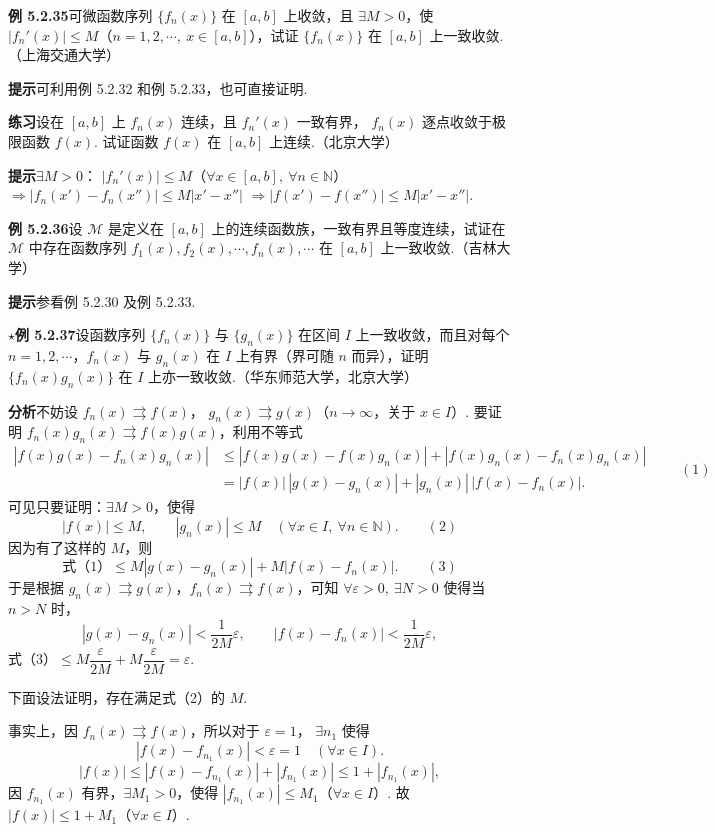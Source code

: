 \documentclass[UTF8,12pt,a4paper,fontset=fandol]{ctexart}
\begin{document}
\noindent\textbf{例 5.2.35}\quad 可微函数序列 $\{f_n(x)\}$ 在 $[a,b]$ 上收敛，且
$\exists M>0$，使 $|f_n'(x)|\le M$（$n=1,2,\cdots,\ x\in[a,b]$），试证
$\{f_n(x)\}$ 在 $[a,b]$ 上一致收敛.（上海交通大学）

\noindent\textbf{提示}\quad 可利用例 5.2.32 和例 5.2.33，也可直接证明.

\noindent\textbf{练习}\quad 设在 $[a,b]$ 上 $f_n(x)$ 连续，且 $f_n'(x)$ 一致有界，
$f_n(x)$ 逐点收敛于极限函数 $f(x)$. 试证函数 $f(x)$ 在 $[a,b]$ 上连续.（北京大学）

\noindent\textbf{提示}\quad $\exists M>0$：
$|f_n'(x)|\le M$（$\forall x\in[a,b],\ \forall n\in\mathbb N$）
$\Rightarrow |f_n(x')-f_n(x'')|\le M|x'-x''|$
$\Rightarrow |f(x')-f(x'')|\le M|x'-x''|$.

\noindent\textbf{例 5.2.36}\quad 设 $\mathcal M$ 是定义在 $[a,b]$ 上的连续函数族，一致有界且等度连续，试证在
$\mathcal M$ 中存在函数序列 $f_1(x),f_2(x),\cdots,f_n(x),\cdots$ 在
$[a,b]$ 上一致收敛.（吉林大学）

\noindent\textbf{提示}\quad 参看例 5.2.30 及例 5.2.33.

\noindent\textbf{$\star$例 5.2.37}\quad 设函数序列 $\{f_n(x)\}$ 与 $\{g_n(x)\}$ 在区间 $I$ 上一致收敛，而且对每个
$n=1,2,\cdots$，$f_n(x)$ 与 $g_n(x)$ 在 $I$ 上有界（界可随 $n$ 而异），证明
$\{f_n(x)g_n(x)\}$ 在 $I$ 上亦一致收敛.（华东师范大学，北京大学）

\noindent\textbf{分析}\quad 不妨设 $f_n(x)\rightrightarrows f(x)$，
$g_n(x)\rightrightarrows g(x)$（$n\to\infty$，关于 $x\in I$）. 要证明
$f_n(x)g_n(x)\rightrightarrows f(x)g(x)$，利用不等式
\[
\begin{aligned}
  |f(x)g(x)-f_n(x)g_n(x)|
  &\le |f(x)g(x)-f(x)g_n(x)|
    +|f(x)g_n(x)-f_n(x)g_n(x)|\\
  &=|f(x)|\,|g(x)-g_n(x)|+|g_n(x)|\,|f(x)-f_n(x)|.
\end{aligned}
\qquad(1)
\]
可见只要证明：$\exists M>0$，使得
\[
  |f(x)|\le M,\qquad |g_n(x)|\le M\quad(\forall x\in I,\ \forall n\in\mathbb N).
\qquad(2)
\]
因为有了这样的 $M$，则
\[
  \text{式（1）}\le M|g(x)-g_n(x)|+M|f(x)-f_n(x)|.
\qquad(3)
\]
于是根据 $g_n(x)\rightrightarrows g(x)$，$f_n(x)\rightrightarrows f(x)$，可知
$\forall\varepsilon>0,\ \exists N>0$ 使得当 $n>N$ 时，
\[
  |g(x)-g_n(x)|<\frac1{2M}\varepsilon,\qquad
  |f(x)-f_n(x)|<\frac1{2M}\varepsilon,
\]
式（3）$\le M\dfrac{\varepsilon}{2M}+M\dfrac{\varepsilon}{2M}=\varepsilon$.

下面设法证明，存在满足式（2）的 $M$.

事实上，因 $f_n(x)\rightrightarrows f(x)$，所以对于 $\varepsilon=1$，
$\exists n_1$ 使得
\[
  |f(x)-f_{n_1}(x)|<\varepsilon=1\quad(\forall x\in I).
\]
\[
  |f(x)|\le |f(x)-f_{n_1}(x)|+|f_{n_1}(x)|\le1+|f_{n_1}(x)|,
\]
因 $f_{n_1}(x)$ 有界，$\exists M_1>0$，使得
$|f_{n_1}(x)|\le M_1$（$\forall x\in I$）. 故
$|f(x)|\le1+M_1$（$\forall x\in I$）.
\end{document}
